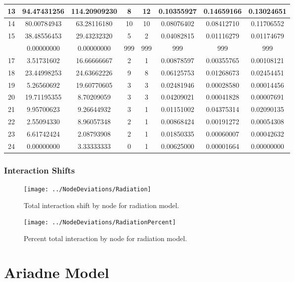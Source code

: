 \documentclass[12pt,a4paper]{thesis}
\begin{document}
\begin{table}[H]
\begin{tabular}{|c|c|c|c|c|c|c|c|}
\hline	13	&	94.47431256	&	114.20909230	&	8	&	12	&	0.10355927	&	0.14659166	&	0.13024651	\\
\hline	14	&	80.00784943	&	63.28116180	&	10	&	10	&	0.08076402	&	0.08412710	&	0.11706552	\\
\hline	15	&	38.48556453	&	29.43232320	&	5	&	2	&	0.04082815	&	0.01116279	&	0.01174679	\\
\rowcolor{yellow}
\hline	16	&	0.00000000	&	0.00000000	&	999	&	999	&	999	&	999	&	999	\\
\hline	17	&	3.51731602	&	16.66666667	&	2	&	1	&	0.00878597	&	0.00355765	&	0.00108121	\\
\hline	18	&	23.44998253	&	24.63662226	&	9	&	8	&	0.06125753	&	0.01268673	&	0.02454451	\\
\hline	19	&	5.26560692	&	19.60770605	&	3	&	3	&	0.02481946	&	0.00028580	&	0.00014456	\\
\hline	20	&	19.71195355	&	8.70209059	&	3	&	3	&	0.04209021	&	0.00041828	&	0.00007691	\\
\hline	21	&	9.95700623	&	9.26644932	&	3	&	1	&	0.01151002	&	0.04375314	&	0.02090135	\\
\hline	22	&	2.55094330	&	8.96057348	&	2	&	1	&	0.00868424	&	0.00191272	&	0.00054308	\\
\hline	23	&	6.61742424	&	2.08793908	&	2	&	1	&	0.01850335	&	0.00060007	&	0.00042632	\\
\hline	24	&	0.00000000	&	3.33333333	&	0	&	1	&	0.00625000	&	0.00001664	&	0.00000000	\\
\hline 
\end{tabular} 
\label{tab:radNodeAfter}
\end{table}

\subsubsection{Interaction Shifts}

\begin{figure}[H]
\centering
\texttt{[image: ../NodeDeviations/Radiation]}
\caption{Total interaction shift by node for radiation model.}
\label{fig:RadiationShift}
\end{figure}

\begin{figure}[H]
\centering
\texttt{[image: ../NodeDeviations/RadiationPercent]}
\caption{Percent total interaction by node for radiation model.}
\label{fig:RadiationPercent}
\end{figure}


\section{Ariadne Model}
\end{document}
